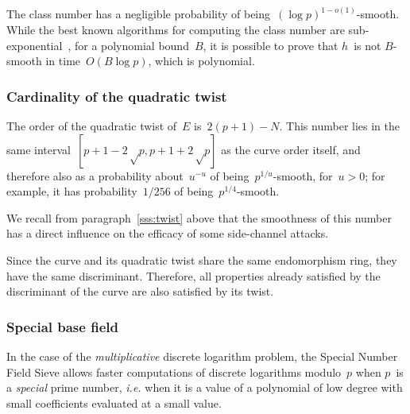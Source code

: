 \documentclass[twocolumn,letterpaper]{article}
\DeclareMathOperator\Cl{Cl}
\begin{document}
The class number has a negligible probability
of being~$(\log p)^{1-o(1)}$-smooth.
While the best known algorithms for computing the class number
are sub-exponential~\cite{ams1989hmc,chile2009biasse},
for a polynomial bound~$B$,
it is possible to prove that $h$~is not $B$-smooth
in time~$O(B \log p)$, which is polynomial.


\subsubsection{Cardinality of the quadratic twist}
\label{sss:normal-twist}

The order of the quadratic twist of~$E$ is~$2(p+1) - N$.
This number lies in the same interval~$[p+1-2√p, p+1+2√p]$
as the curve order itself,
and therefore also as a probability about~$u^{-u}$
of being~$p^{1/u}$-smooth, for~$u > 0$;
for example, it has probability~$1/256$ of being~$p^{1/4}$-smooth.

We recall from paragraph~\ref{sss:twist} above
that the smoothness of this number has a direct influence
on the efficacy of some side-channel attacks.

Since the curve and its quadratic twist
share the same endomorphism ring,
they have the same discriminant.
Therefore, all properties already satisfied
by the discriminant of the curve are also satisfied by its twist.

\subsubsection{Special base field}
\label{sss:special-anormal}

In the case of the \emph{multiplicative} discrete logarithm problem,
the Special Number Field Sieve allows faster computations
of discrete logarithms modulo~$p$
when $p$~is a \emph{special} prime number,
\emph{i.e.} when it is a value of a polynomial of low degree
with small coefficients evaluated at a small value.
\end{document}

